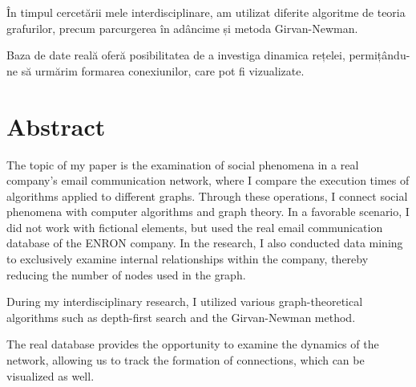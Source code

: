 În timpul cercetării mele interdisciplinare, am utilizat diferite algoritme de teoria grafurilor, precum parcurgerea în adâncime și metoda Girvan-Newman.

Baza de date reală oferă posibilitatea de a investiga dinamica rețelei, permițându-ne să urmărim formarea conexiunilor, care pot fi vizualizate.

\vfill
{}

\chapter*{Abstract}


The topic of my paper is the examination of social phenomena in a real company's email communication network, where I compare the execution times of algorithms applied to different graphs. Through these operations, I connect social phenomena with computer algorithms and graph theory. In a favorable scenario, I did not work with fictional elements, but used the real email communication database of the ENRON company. In the research, I also conducted data mining to exclusively examine internal relationships within the company, thereby reducing the number of nodes used in the graph.

During my interdisciplinary research, I utilized various graph-theoretical algorithms such as depth-first search and the Girvan-Newman method.


The real database provides the opportunity to examine the dynamics of the network, allowing us to track the formation of connections, which can be visualized as well.


\vfill
\dolgozatnyelve
{}